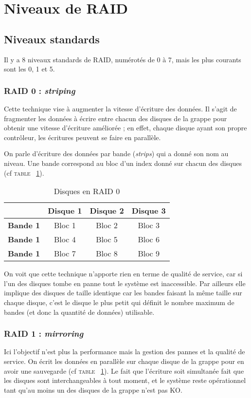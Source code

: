 \section{Niveaux de RAID}

\subsection{Niveaux standards}
Il y a 8 niveaux standards de RAID, numérotés de 0 à 7, mais les plus courants sont les 0, 1 et 5. 

\subsubsection{RAID 0 : \textit{striping}}
Cette technique vise à augmenter la vitesse d'écriture des données. Il s'agit de fragmenter les données à écrire entre chacun des disques de la grappe pour obtenir une vitesse d'écriture améliorée ; en effet, chaque disque ayant son propre contrôleur, les écritures peuvent se faire en parallèle. 

On parle d'écriture des données par bande (\textit{strips}) qui a donné son nom au niveau. Une bande correspond au bloc d'un index donné sur chacun des disques (cf \textsc{table ~\ref{striping}}).

\begin{table}[h]
    \centering
    \caption{\label{striping} Disques en RAID 0}
    \begin{tabular}{|c|c|c|c|}
        \hline
         & \textbf{Disque 1} & \textbf{Disque 2} & \textbf{Disque 3} \\
        \hline
        \textbf{Bande 1} & Bloc 1 & Bloc 2 & Bloc 3 \\
        \hline
        \textbf{Bande 1} & Bloc 4 & Bloc 5 & Bloc 6 \\
        \hline
        \textbf{Bande 1} & Bloc 7 & Bloc 8 & Bloc 9 \\
        \hline
    \end{tabular}
\end{table}

On voit que cette technique n'apporte rien en terme de qualité de service, car si l'un des disques tombe en panne tout le système est inaccessible. Par ailleurs elle implique des disques de taille identique car les bandes faisant la même taille sur chaque disque, c'est le disque le plus petit qui définit le nombre maximum de bandes (et donc la quantité de données) utilisable. 

\subsubsection{RAID 1 : \textit{mirroring}}
Ici l'objectif n'est plus la performance mais la gestion des pannes et la qualité de service. On écrit les données en parallèle sur chaque disque de la grappe pour en avoir une sauvegarde (cf \textsc{table ~\ref{striping}}). Le fait que l'écriture soit simultanée fait que les disques sont interchangeables à tout moment, et le système reste opérationnel tant qu'au moins un des disques de la grappe n'est pas KO. 

